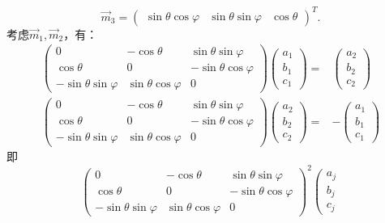 \documentclass[reqno,a4paper,12pt]{amsart}
\begin{document}
\begin{tcolorbox}[breakable, colback = black!5!white, colframe = black]
\[
	\vec{m}_3 = (
	\begin{matrix}
		\sin\theta\cos\varphi & \sin\theta\sin\varphi & \cos\theta
	\end{matrix}
	)^T.
\]
考虑$\vec{m}_1,\vec{m}_2$，有：
\begin{align*}
	\left(
	\begin{matrix}
		0 & -\cos\theta & \sin\theta\sin\varphi \\
		\cos\theta & 0 & -\sin\theta\cos\varphi \\
		-\sin\theta\sin\varphi & \sin\theta\cos\varphi & 0
	\end{matrix}
	\right)
	\left(
	\begin{matrix}
		a_1 \\ 
		b_1 \\ 
		c_1
	\end{matrix}
	\right)
	=& 
	\left(
	\begin{matrix}
		a_2 \\ 
		b_2 \\ 
		c_2
	\end{matrix}
	\right) \\
	\left(
	\begin{matrix}
		0 & -\cos\theta & \sin\theta\sin\varphi \\
		\cos\theta & 0 & -\sin\theta\cos\varphi \\
		-\sin\theta\sin\varphi & \sin\theta\cos\varphi & 0
	\end{matrix}
	\right)
	\left(
	\begin{matrix}
		a_2 \\ 
		b_2 \\ 
		c_2
	\end{matrix}
	\right)
	=& 
	-\left(
	\begin{matrix}
		a_1 \\
		b_1 \\
		c_1
	\end{matrix}
	\right)
\end{align*}
即
\[
	\left(
	\begin{matrix}
		0 & -\cos\theta & \sin\theta\sin\varphi \\
		\cos\theta & 0 & -\sin\theta\cos\varphi \\
		-\sin\theta\sin\varphi & \sin\theta\cos\varphi & 0
	\end{matrix}
	\right)^2
	\left(
	\begin{matrix}
		a_j \\ 
		b_j \\ 
		c_j
	\end{matrix}
\]
\end{tcolorbox}
\end{document}
